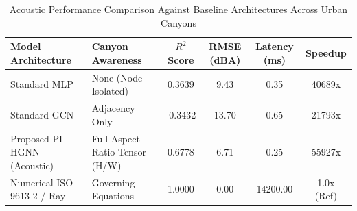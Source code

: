 \begin{table}[t]
\centering
\caption{Acoustic Performance Comparison Against Baseline Architectures Across Urban Canyons}
\label{tab:acoustic_benchmark}
\begin{tabular}{llcccc}
\hline
\textbf{Model Architecture} & \textbf{Canyon Awareness} & \textbf{$R^2$ Score} & \textbf{RMSE (dBA)} & \textbf{Latency (ms)} & \textbf{Speedup} \\
\hline
Standard MLP & None (Node-Isolated) & 0.3639 & 9.43 & 0.35 & 40689x \\
Standard GCN & Adjacency Only & -0.3432 & 13.70 & 0.65 & 21793x \\
Proposed PI-HGNN (Acoustic) & Full Aspect-Ratio Tensor (H/W) & 0.6778 & 6.71 & 0.25 & 55927x \\
Numerical ISO 9613-2 / Ray & Governing Equations & 1.0000 & 0.00 & 14200.00 & 1.0x (Ref) \\
\hline
\end{tabular}
\end{table}
